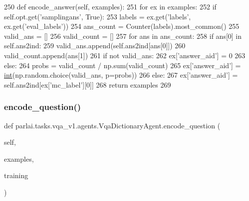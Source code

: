 \begin{DoxyCode}
250     \textcolor{keyword}{def }encode\_answer(self, examples):
251         \textcolor{keywordflow}{for} ex \textcolor{keywordflow}{in} examples:
252             \textcolor{keywordflow}{if} self.opt.get(\textcolor{stringliteral}{'samplingans'}, \textcolor{keyword}{True}):
253                 labels = ex.get(\textcolor{stringliteral}{'labels'}, ex.get(\textcolor{stringliteral}{'eval\_labels'}))
254                 ans\_count = Counter(labels).most\_common()
255                 valid\_ans = []
256                 valid\_count = []
257                 \textcolor{keywordflow}{for} ans \textcolor{keywordflow}{in} ans\_count:
258                     \textcolor{keywordflow}{if} ans[0] \textcolor{keywordflow}{in} self.ans2ind:
259                         valid\_ans.append(self.ans2ind[ans[0]])
260                         valid\_count.append(ans[1])
261                 \textcolor{keywordflow}{if} \textcolor{keywordflow}{not} valid\_ans:
262                     ex[\textcolor{stringliteral}{'answer\_aid'}] = 0
263                 \textcolor{keywordflow}{else}:
264                     probs = valid\_count / np.sum(valid\_count)
265                     ex[\textcolor{stringliteral}{'answer\_aid'}] = \hyperlink{namespacelanguage__model_1_1eval__ppl_a7d12ee00479673c5c8d1f6d01faa272a}{int}(np.random.choice(valid\_ans, p=probs))
266             \textcolor{keywordflow}{else}:
267                 ex[\textcolor{stringliteral}{'answer\_aid'}] = self.ans2ind[ex[\textcolor{stringliteral}{'mc\_label'}][0]]
268         \textcolor{keywordflow}{return} examples
269 
\end{DoxyCode}
\mbox{\label{classparlai_1_1tasks_1_1vqa__v1_1_1agents_1_1VqaDictionaryAgent_af2c2144d6a142cb70d8954b00d3a3720}} 
\subsubsection{\texorpdfstring{encode\+\_\+question()}{encode\_question()}}
{\footnotesize\ttfamily def parlai.\+tasks.\+vqa\+\_\+v1.\+agents.\+Vqa\+Dictionary\+Agent.\+encode\+\_\+question (\begin{DoxyParamCaption}\item[{}]{self,  }\item[{}]{examples,  }\item[{}]{training }\end{DoxyParamCaption})}



